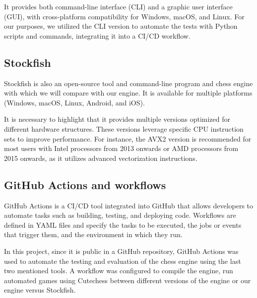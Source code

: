\vspace{1em}

\noindent It provides both command-line interface (CLI) and a graphic user interface (GUI), with cross-platform compatibility for Windows, macOS, and Linux. For our purposes, we utilized the CLI version to automate the tests with Python scripts and commands, integrating it into a CI/CD workflow.

\subsection{Stockfish}

Stockfish is also an open-source tool and command-line program and chess engine with which we will compare with our engine. It is available for multiple platforms (Windows, macOS, Linux, Android, and iOS).

\vspace{1em}

\noindent It is necessary to highlight that it provides multiple versions optimized for different hardware structures. These versions leverage specific CPU instruction sets to improve performance. For instance, the AVX2 version is recommended for most users with Intel processors from 2013 onwards or AMD processors from 2015 onwards, as it utilizes advanced vectorization instructions.

\subsection{GitHub Actions and workflows}

GitHub Actions is a CI/CD tool integrated into GitHub that allows developers to automate tasks such as building, testing, and deploying code. Workflows are defined in YAML files and specify the tasks to be executed, the jobs or events that trigger them, and the environment in which they run.

\vspace{1em}

\noindent In this project, since it is public in a GitHub repository, GitHub Actions was used to automate the testing and evaluation of the chess engine using the last two mentioned tools. A workflow was configured to compile the engine, run automated games using Cutechess between different versions of the engine or our engine versus Stockfish.
